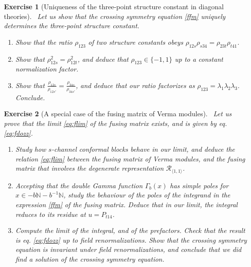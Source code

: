 \documentclass[12pt, a4paper, notitlepage, twoside]{report}
\numberwithin{equation}{section}
\theoremstyle{break}
\newtheorem{exo}{Exercise}[chapter]
\begin{document}
\begin{exo}[Uniqueness of the three-point structure constant in diagonal theories]
 ~\label{exoudt}
 Let us show that the crossing symmetry equation \eqref{ffm} uniquely determines the three-point structure constant. 
 \begin{enumerate}
  \item Show that the ratio $\rho_{123}$ of two structure constants obeys $\rho_{12s}\rho_{s34} = \rho_{23t}\rho_{t41}$.
  \item Show that $\rho_{12s}^2 = \rho_{12t}^2$, and deduce that $\rho_{123}\in\{-1,1\}$ up to a constant normalization factor.
  \item Show that $\frac{\rho_{12s}}{\rho_{12s'}} = \frac{\rho_{34s}}{\rho_{34s'}} $, and deduce that our ratio factorizes as $\rho_{123} = \lambda_1\lambda_2\lambda_3$. Conclude.
 \end{enumerate} 
\end{exo}

\begin{exo}[A special case of the fusing matrix of Verma modules]
 ~\label{exoflfg}
 Let us prove that the limit \eqref{eq:flim} of the fusing matrix exists, and is given by eq. \eqref{eq:fdozz}. 
 \begin{enumerate}
 \item Study how $s$-channel conformal blocks behave in our limit, and deduce the relation \eqref{eq:flim} between the fusing matrix of Verma modules, and the fusing matrix that involves the degenerate representation $\mathcal{R}_{\langle 1,1\rangle}$. 
  \item Accepting that the double Gamma function $\Gamma_b(x)$ has simple poles for $x\in -b\mathbb{N}-b^{-1}\mathbb{N}$, study the behaviour of the poles of the integrand in the expression \eqref{ffm} of the fusing matrix. Deduce that in our limit, the integral reduces to its residue at $u=P_{t14}$.
  \item Compute the limit of the integral, and of the prefactors. Check that the result is eq. \eqref{eq:fdozz} up to field renormalizations. Show that the crossing symmetry equation is invariant under field renormalizations, and conclude that we did find a solution of the crossing symmetry equation.
 \end{enumerate}
\end{exo}



\end{document}
